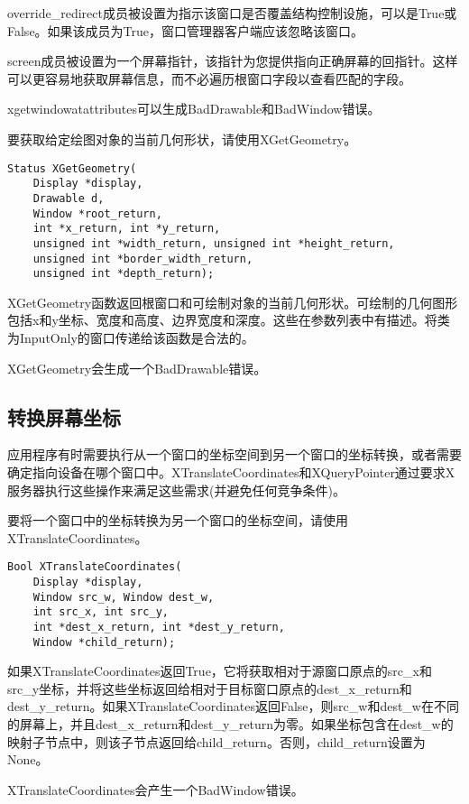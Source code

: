override\_redirect成员被设置为指示该窗口是否覆盖结构控制设施，可以是True或False。如果该成员为True，窗口管理器客户端应该忽略该窗口。

screen成员被设置为一个屏幕指针，该指针为您提供指向正确屏幕的回指针。这样可以更容易地获取屏幕信息，而不必遍历根窗口字段以查看匹配的字段。

xgetwindowatattributes可以生成BadDrawable和BadWindow错误。

\noindent 要获取给定绘图对象的当前几何形状，请使用XGetGeometry。

\begin{lstlisting}
Status XGetGeometry(
	Display *display,
	Drawable d,
	Window *root_return,
	int *x_return, int *y_return,
	unsigned int *width_return, unsigned int *height_return,
	unsigned int *border_width_return,
	unsigned int *depth_return);
\end{lstlisting}

XGetGeometry函数返回根窗口和可绘制对象的当前几何形状。可绘制的几何图形包括x和y坐标、宽度和高度、边界宽度和深度。这些在参数列表中有描述。将类为InputOnly的窗口传递给该函数是合法的。

XGetGeometry会生成一个BadDrawable错误。

\subsection{转换屏幕坐标}

应用程序有时需要执行从一个窗口的坐标空间到另一个窗口的坐标转换，或者需要确定指向设备在哪个窗口中。XTranslateCoordinates和XQueryPointer通过要求X服务器执行这些操作来满足这些需求(并避免任何竞争条件)。

要将一个窗口中的坐标转换为另一个窗口的坐标空间，请使用XTranslateCoordinates。

\begin{lstlisting}
Bool XTranslateCoordinates(
	Display *display,
	Window src_w, Window dest_w,
	int src_x, int src_y,
	int *dest_x_return, int *dest_y_return,
	Window *child_return);
\end{lstlisting}

如果XTranslateCoordinates返回True，它将获取相对于源窗口原点的src\_x和src\_y坐标，并将这些坐标返回给相对于目标窗口原点的dest\_x\_return和dest\_y\_return。如果XTranslateCoordinates返回False，则src\_w和dest\_w在不同的屏幕上，并且dest\_x\_return和dest\_y\_return为零。如果坐标包含在dest\_w的映射子节点中，则该子节点返回给child\_return。否则，child\_return设置为None。

XTranslateCoordinates会产生一个BadWindow错误。

